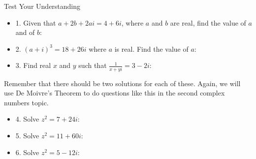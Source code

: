 \documentclass[8pt]{beamer}
\begin{document}
	\begin{frame}{Test Your Understanding}
        \begin{itemize}
            \item 1. Given that $a+2b+2ai=4+6i$, where $a$ and $b$ are real, find the value of $a$ and of $b$: 
            \item 2. $(a+i)^3=18+26i$ where $a$ is real. Find the value of $a$: 
            \item 3. Find real $x$ and $y$ such that $\frac{1}{x+yi}=3-2i$: 
        \end{itemize}
        
        \alert<1>{Remember that there should be two solutions for each of these. Again, we will use De Moivre’s Theorem to do questions like this in the second complex numbers topic.}
        
        \begin{itemize}
            \item 4. Solve $z^2=7+24i$: 
            \item 5. Solve $z^2=11+60i$: 
            \item 6. Solve $z^2=5−12i$: 
        \end{itemize}
    \end{frame}
\end{document}
